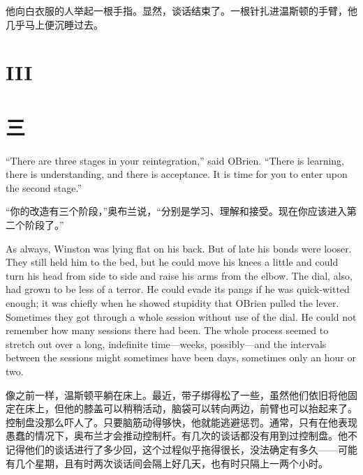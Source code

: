 \begin{paracol}{2}
\switchcolumn

他向白衣服的人举起一根手指。显然，谈话结束了。一根针扎进温斯顿的手臂，他几乎马上便沉睡过去。

\switchcolumn*


\section{III}\label{iii-2}

\switchcolumn

\section*{三}\label{ux4e8cux5341ux4e00}

\switchcolumn*

``There are three stages in your reintegration,'' said
O\textquotesingle Brien. ``There is learning, there is understanding, and
there is acceptance. It is time for you to enter upon the second stage.''

\switchcolumn

``你的改造有三个阶段，''奥布兰说，``分别是学习、理解和接受。现在你应该进入第二个阶段了。''

\switchcolumn*

As always, Winston was lying flat on his back. But of late his bonds
were looser. They still held him to the bed, but he could move his knees
a little and could turn his head from side to side and raise his arms
from the elbow. The dial, also, had grown to be less of a terror. He
could evade its pangs if he was quick-witted enough; it was chiefly when
he showed stupidity that O\textquotesingle Brien pulled the lever.
Sometimes they got through a whole session without use of the dial. He
could not remember how many sessions there had been. The whole process
seemed to stretch out over a long, indefinite time---weeks,
possibly---and the intervals between the sessions might sometimes have
been days, sometimes only an hour or two.

\switchcolumn

像之前一样，温斯顿平躺在床上。最近，带子绑得松了一些，虽然他们依旧将他固定在床上，但他的膝盖可以稍稍活动，脑袋可以转向两边，前臂也可以抬起来了。控制盘没那么吓人了。只要脑筋动得够快，他就能逃避惩罚。通常，只有在他表现愚蠢的情况下，奥布兰才会推动控制杆。有几次的谈话都没有用到过控制盘。他不记得他们的谈话进行了多少回，这个过程似乎拖得很长，没法确定有多久——可能有几个星期，且有时两次谈话间会隔上好几天，也有时只隔上一两个小时。


\end{paracol}
